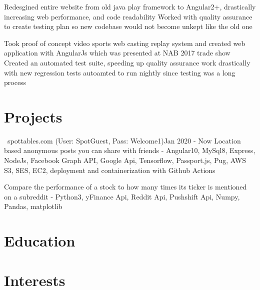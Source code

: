 \documentclass{my_resume}
\begin{document}
\workitemstwo
{Redesgined entire website from old java play framework to Angular2+, drastically increasing web performance, and code readability}
{Worked with quality assurance to create testing plan so new codebase would not become unkept like the old one}

\workitemstwo
{Took proof of concept video sports web casting replay system and created web application with AngularJs
 which was presented at NAB 2017 trade show}
{Created an automated test suite, speeding up quality assurance work drastically with new regression tests
 autoamted to run nightly since testing was a long process}

\section{Projects}

{\faChrome~spottables.com (User: SpotGuest, Pass: Welcome1)}{Jan 2020 - Now}
\projectitem
{Location based anonymous posts you can share with friends
 - Angular10, MySql8, Express, NodeJs, Facebook Graph API, Google Api, Tensorflow, Passport.js, Pug,
  AWS S3, SES, EC2, deployment and containerization with Github Actions }

\projectitem
{Compare the performance of a stock to how many times its ticker is mentioned on a subreddit
 - Python3, yFinance Api, Reddit Api, Pushshift Api, Numpy, Pandas, matplotlib}

\section{Education}

\section{Interests}
\end{document}
